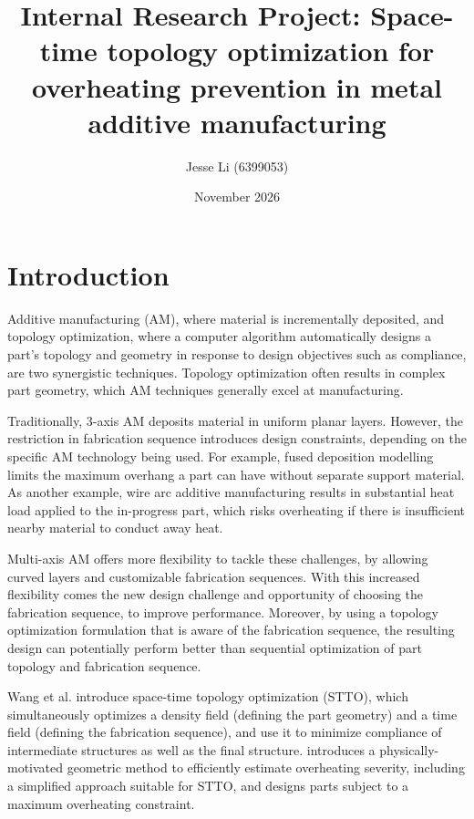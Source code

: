 \documentclass{article}
\title{Internal Research Project: Space-time topology optimization for overheating prevention in metal additive manufacturing}
\author{Jesse Li (6399053)}
\date{November 2026}
\let\oldtodo\todo %
\renewcommand{\todo}[1]{\oldtodo[inline]{\detokenize{#1}}}
\begin{document}
\maketitle

\section{Introduction}
Additive manufacturing (AM), where material is incrementally deposited, and topology optimization, where a computer algorithm automatically designs a part's topology and geometry in response to design objectives such as compliance, are two synergistic techniques. Topology optimization often results in complex part geometry, which AM techniques generally excel at manufacturing.

Traditionally, 3-axis AM deposits material in uniform planar layers. However, the restriction in fabrication sequence introduces design constraints, depending on the specific AM technology being used. For example, fused deposition modelling limits the maximum overhang a part can have without separate support material. As another example, wire arc additive manufacturing results in substantial heat load applied to the in-progress part, which risks overheating if there is insufficient nearby material to conduct away heat.

Multi-axis AM offers more flexibility to tackle these challenges, by allowing curved layers and customizable fabrication sequences. With this increased flexibility comes the new design challenge and opportunity of choosing the fabrication sequence, to improve performance.
Moreover, by using a topology optimization formulation that is aware of the fabrication sequence, the resulting design can potentially perform better than sequential optimization of part topology and fabrication sequence.

Wang et al. \cite{wang2020spacetime} introduce space-time topology optimization (STTO), which simultaneously optimizes a density field (defining the part geometry) and a time field (defining the fabrication sequence), and use it to minimize compliance of intermediate structures as well as the final structure.
\cite{das2023thesis} introduces a physically-motivated geometric method to efficiently estimate overheating severity, including a simplified approach suitable for STTO, and designs parts subject to a maximum overheating constraint.
\end{document}
